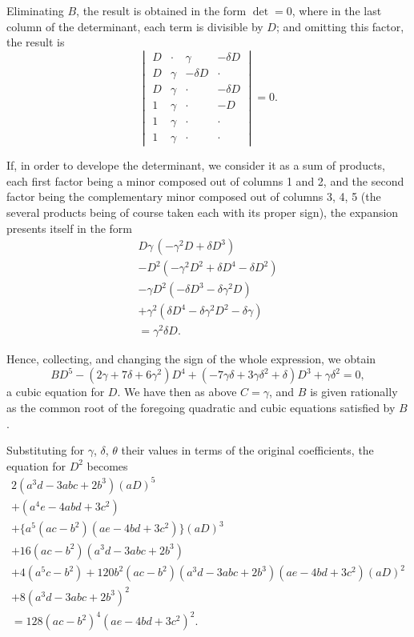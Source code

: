 \documentclass[11pt,a4paper]{article}
\theoremstyle{cayley}
\begin{document}
Eliminating $B$, the result is obtained in the form $\det = 0$, where in the last column of the determinant, each term is divisible by $D$; and omitting this factor, the result is
\[
\begin{vmatrix}
D & \cdot & \gamma & -\delta D \\
D & \gamma & -\delta D & \cdot \\
D & \gamma & \cdot & -\delta D \\
1 & \gamma & \cdot & -D \\
1 & \gamma & \cdot & \cdot \\
1 & \gamma & \cdot & \cdot
\end{vmatrix} = 0.
\]

If, in order to develope the determinant, we consider it as a sum of products, each first factor being a minor composed out of columns 1 and 2, and the second factor being the complementary minor composed out of columns 3, 4, 5 (the several products being of course taken each with its proper sign), the expansion presents itself in the form
\begin{multline*}
D\gamma\,(-\gamma^{2}D + \delta D^{3}) \\
- D^{2}(-\gamma^{2}D^{2} + \delta D^{4} - \delta D^{2}) \\
- \gamma D^{2}(-\delta D^{3} - \delta\gamma^{2}D) \\
+ \gamma^{2}(\delta D^{4} - \delta\gamma^{2}D^{2} - \delta\gamma) \\
= \gamma^{2}\delta D.
\end{multline*}

Hence, collecting, and changing the sign of the whole expression, we obtain
\[
BD^{5} - (2\gamma + 7\delta + 6\gamma^{2})D^{4} + (-7\gamma\delta + 3\gamma\delta^{2} + \delta)D^{3} + \gamma\delta^{2} = 0,
\]
a cubic equation for $D$. We have then as above $C = \gamma$, and $B$ is given rationally as the common root of the foregoing quadratic and cubic equations satisfied by $B$.

Substituting for $\gamma$, $\delta$, $\theta$ their values in terms of the original coefficients, the equation for $D^{2}$ becomes
\begin{multline*}
2(a^{3}d - 3abc + 2b^{3})(aD)^{5} \\
+ (a^{4}e - 4abd + 3c^{2}) \\
+ \{a^{5}(ac - b^{2})(ae - 4bd + 3c^{2})\}(aD)^{3} \\
+ 16(ac - b^{2})(a^{3}d - 3abc + 2b^{3}) \\
+ 4(a^{5}c - b^{2}) + 120b^{2}(ac - b^{2})(a^{3}d - 3abc + 2b^{3})(ae - 4bd + 3c^{2})(aD)^{2} \\
+ 8(a^{3}d - 3abc + 2b^{3})^{2} \\
= 128(ac - b^{2})^{4}(ae - 4bd + 3c^{2})^{2}.
\end{multline*}
\end{document}
